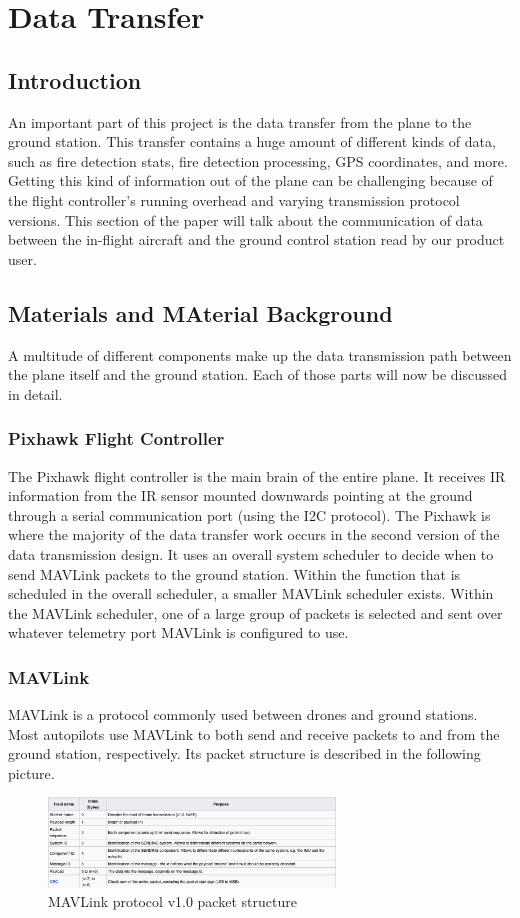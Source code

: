 \documentclass[12pt,journal,compsoc]{IEEEtran}
\begin{document}
\section{Data Transfer}
\subsection{Introduction}
An important part of this project is the data transfer from the plane to the ground station. This transfer contains a huge amount of different kinds of data, such as fire detection stats, fire detection processing, GPS coordinates, and more. Getting this kind of information out of the plane can be challenging because of the flight controller's running overhead and varying transmission protocol versions. This section of the paper will talk about the communication of data between the in-flight aircraft and the ground control station read by our product user.

\subsection{Materials and MAterial Background}
A multitude of different components make up the data transmission path between the plane itself and the ground station. Each of those parts will now be discussed in detail.
\subsubsection{Pixhawk Flight Controller}
The Pixhawk flight controller is the main brain of the entire plane. It receives IR information from the IR sensor mounted downwards pointing at the ground through a serial communication port (using the I2C protocol). The Pixhawk is where the majority of the data transfer work occurs in the second version of the data transmission design. It uses an overall system scheduler to decide when to send MAVLink packets to the ground station. Within the function that is scheduled in the overall scheduler, a smaller MAVLink scheduler exists. Within the MAVLink scheduler, one of a large group of packets is selected and sent over whatever telemetry port MAVLink is configured to use.
\subsubsection{MAVLink}
MAVLink is a protocol commonly used between drones and ground stations. Most autopilots use MAVLink to both send and receive packets to and from the ground station, respectively. Its packet structure is described in the following picture.
\begin{figure}[h!]
\hspace*{0cm}
\centering
\includegraphics[width=3in]{MavlinkStructure.png}
\caption{MAVLink protocol v1.0 packet structure}
\label{mavStruct}
\end{figure}
\end{document}
